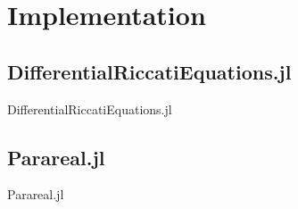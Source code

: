 \section{Implementation}

\subsection{DifferentialRiccatiEquations.jl}
\begin{frame}{DifferentialRiccatiEquations.jl}
\end{frame}

\subsection{Parareal.jl}
\begin{frame}{Parareal.jl}
\end{frame}

